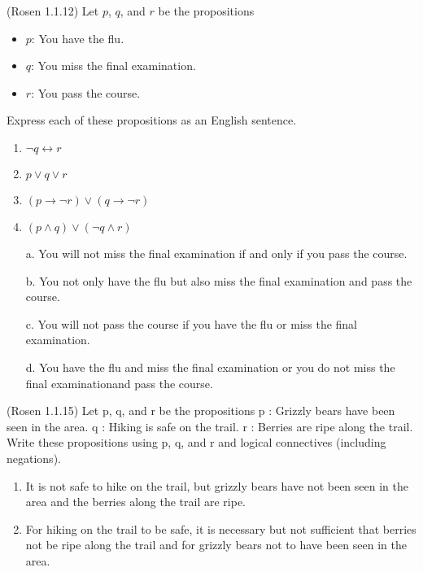 \documentclass[10pt]{exam}
\begin{document}
\begin{questions}

\question[4] (Rosen 1.1.12) Let $p$, $q$, and $r$ be the propositions
\begin{itemize}
  \item $p$: You have the flu.
  \item $q$: You miss the final examination.
  \item $r$: You pass the course.
\end{itemize}

Express each of these propositions as an English sentence.

\begin{enumerate} [label=(\alph*)]
  \item $\neg q \leftrightarrow r$
  \item $p \lor q \lor r$
  \item $(p \rightarrow \neg r) \lor (q \rightarrow \neg r)$
  \item $(p \land q) \lor (\neg q \land r)$
\end{enumerate}

\begin{enumerate}
  \item [a.]You will not miss the final examination if and only if you pass the course.
  \item [b.]You not only have the flu but also miss the final examination and pass the course.
  \item [c.]You will not pass the course if you have the flu or miss the final examination.
  \item [d.]You have the flu and miss the final examination or you do not miss the final examinationand pass the course.  
\end{enumerate}



\question[4] (Rosen 1.1.15)  Let p, q, and r be the propositions
\newline p : Grizzly bears have been seen in the area.
\newline q : Hiking is safe on the trail.
\newline r : Berries are ripe along the trail.
\newline Write these propositions using p, q, and r and logical connectives (including negations).

\begin{enumerate} [label=(\alph*)]
  \item It is not safe to hike on the trail, but grizzly bears have not been seen in the area and the berries along the trail are ripe.
  \item For hiking on the trail to be safe, it is necessary but not sufficient that berries not be ripe along the trail and for grizzly bears not to have been seen in the area.
\end{enumerate}


\end{questions}
\end{document}
